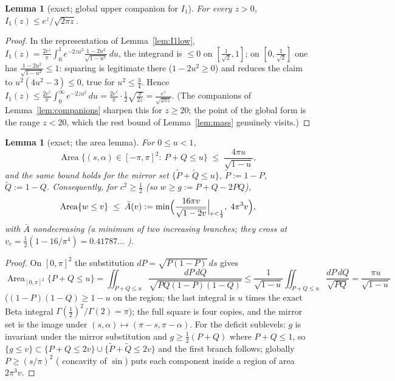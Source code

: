 \documentclass[11pt]{article}
\newtheorem{lemma}[theorem]{Lemma}
\theoremstyle{remark}
\begin{document}
\begin{lemma}[exact; global upper companion for $I_1$]
\label{lem:I1up}
For every $z>0$, $I_1(z)\le e^z/\sqrt{2\pi z}$.
\end{lemma}

\begin{proof}
In the representation of Lemma~\ref{lem:I1low},
$I_1(z)=\frac{2e^z}{\pi}\int_0^1e^{-2zu^2}
\frac{1-2u^2}{\sqrt{1-u^2}}\,du$, the integrand is $\le0$ on
$[\tfrac1{\sqrt2},1]$; on $[0,\tfrac1{\sqrt2}]$ one has
$\frac{1-2u^2}{\sqrt{1-u^2}}\le1$: squaring is legitimate there
($1-2u^2\ge0$) and reduces the claim to $u^2(4u^2-3)\le0$, true for
$u^2\le\tfrac34$. Hence
$I_1(z)\le\frac{2e^z}{\pi}\int_0^\infty e^{-2zu^2}\,du
=\frac{2e^z}{\pi}\cdot\frac12\sqrt{\frac{\pi}{2z}}
=\frac{e^z}{\sqrt{2\pi z}}$. \textup{(}The companions of
Lemma~\ref{lem:companions} sharpen this for $z\ge20$; the point of
the global form is the range $z<20$, which the rest bound of
Lemma~\ref{lem:mass} genuinely visits.\textup{)}
\end{proof}

\begin{lemma}[exact; the area lemma]\label{lem:area}
For $0\le u<1$,
\[
\operatorname{Area}\bigl\{(s,\alpha)\in[-\pi,\pi]^2:\ P+Q\le u\bigr\}
\;\le\;\frac{4\pi u}{\sqrt{1-u}},
\]
and the same bound holds for the mirror set
$\{\tilde P+\tilde Q\le u\}$, $\tilde P:=1-P$, $\tilde Q:=1-Q$.
Consequently, for $c^2\ge\tfrac12$ \textup{(}so
$w\ge g:=P+Q-2PQ$\textup{)},
\[
\operatorname{Area}\{w\le v\}\;\le\;\bar A(v):=
\min\Bigl(\frac{16\pi v}{\sqrt{1-2v}}\Big|_{v<\frac12},\;
4\pi^3v\Bigr),
\]
with $\bar A$ nondecreasing \textup{(}a minimum of two increasing
branches; they cross at $v_c=\tfrac12(1-16/\pi^4)=0.41787\ldots$%
\textup{)}.
\end{lemma}

\begin{proof}
On $[0,\pi]^2$ the substitution $dP=\sqrt{P(1-P)}\,ds$ gives
\[
\operatorname{Area}_{[0,\pi]^2}\{P+Q\le u\}
=\iint_{P+Q\le u}\frac{dP\,dQ}{\sqrt{PQ(1-P)(1-Q)}}
\le\frac{1}{\sqrt{1-u}}\iint_{P+Q\le u}\frac{dP\,dQ}{\sqrt{PQ}}
=\frac{\pi u}{\sqrt{1-u}}
\]
\textup{(}$(1-P)(1-Q)\ge1-u$ on the region; the last integral is
$u$ times the exact Beta integral
$\Gamma(\tfrac12)^2/\Gamma(2)=\pi$\textup{)}; the full square is
four copies, and the mirror set is the image under
$(s,\alpha)\mapsto(\pi-s,\pi-\alpha)$. For the deficit sublevels:
$g$ is invariant under the mirror substitution and
$g\ge\tfrac12(P+Q)$ where $P+Q\le1$, so
$\{g\le v\}\subset\{P+Q\le2v\}\cup\{\tilde P+\tilde Q\le2v\}$ and
the first branch follows; globally $P\ge(s/\pi)^2$ \textup{(}%
concavity of $\sin$\textup{)} puts each component inside a region
of area $2\pi^3v$.
\end{proof}
\end{document}
